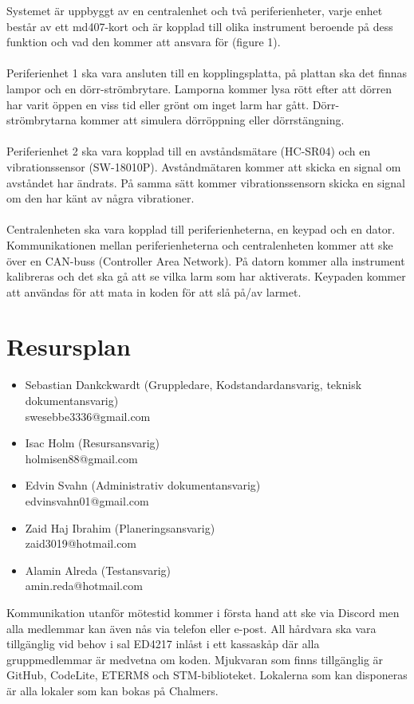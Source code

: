 \documentclass[a4paper]{article}
\begin{document}
Systemet är uppbyggt av en centralenhet och två periferienheter, varje enhet består av ett md407-kort och är kopplad till olika instrument beroende på dess funktion och vad den kommer att ansvara för (figure 1). \\
\\
Periferienhet 1 ska vara ansluten till en kopplingsplatta, på plattan ska det finnas lampor och en dörr-strömbrytare. Lamporna kommer lysa rött efter att dörren har varit öppen en viss tid eller grönt om inget larm har gått. Dörr-strömbrytarna kommer att simulera dörröppning eller dörrstängning. \\
\\
Periferienhet 2 ska vara kopplad till en avståndsmätare (HC-SR04) och en vibrationssensor (SW-18010P). Avståndmätaren kommer att skicka en signal om avståndet har ändrats. På samma sätt kommer vibrationssensorn skicka en signal om den har känt av några vibrationer. \\
\\
Centralenheten ska vara kopplad till periferienheterna, en keypad och en dator. Kommunikationen mellan periferienheterna och centralenheten kommer att ske över en CAN-buss (Controller Area Network). På datorn kommer alla instrument kalibreras och det ska gå att se vilka larm som har aktiverats. Keypaden kommer att användas för att mata in koden för att slå på/av larmet.
\newpage


\section{Resursplan}
\begin{itemize}
 \item Sebastian Dankckwardt (Gruppledare, Kodstandardansvarig, teknisk dokumentansvarig)
 \\swesebbe3336@gmail.com
 \item Isac Holm (Resursansvarig)
 \\holmisen88@gmail.com
 \item Edvin Svahn (Administrativ dokumentansvarig)
 \\edvinsvahn01@gmail.com
 \item Zaid Haj Ibrahim (Planeringsansvarig)
 \\zaid3019@hotmail.com
 \item Alamin Alreda (Testansvarig)
 \\amin.reda@hotmail.com
\end{itemize}


Kommunikation utanför mötestid kommer i första hand att ske via Discord men alla medlemmar kan även nås via telefon eller e-post. All hårdvara ska vara tillgänglig vid behov i sal ED4217 inlåst i ett kassaskåp där alla gruppmedlemmar är medvetna om koden. Mjukvaran som finns tillgänglig är GitHub, CodeLite, ETERM8 och STM-biblioteket. Lokalerna som kan disponeras är alla lokaler som kan bokas på Chalmers. \\
\end{document}

